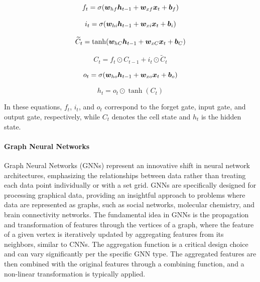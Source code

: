 \begin{equation}
f_t = \sigma(\bm {w}_{hf}\bm {h}_{t-1} + \bm {w}_{xf}\bm {x}_t + \bm {b}_f)
\end{equation}

\begin{equation}
i_t = \sigma(\bm {w}_{hi}\bm {h}_{t-1} + \bm {w}_{xi}\bm {x}_t + \bm {b}_i)
\end{equation}

\begin{equation}
\widetilde{C}_t = \tanh(\bm {w}_{hC}\bm {h}_{t-1} + \bm {w}_{xC}\bm {x}_t + \bm {b}_C)
\end{equation}

\begin{equation}
C_t = f_t \odot C_{t-1} + i_t \odot \widetilde{C}_t
\end{equation}

\begin{equation}
o_t = \sigma(\bm {w}_{ho}\bm {h}_{t-1} + \bm {w}_{xo}\bm {x}_t + \bm {b}_o)
\end{equation}

\begin{equation}
h_t = o_t \odot \tanh(C_t)
\end{equation}

In these equations, $f_t$, $i_t$, and $o_t$ correspond to the forget gate, input gate, and output gate, respectively, while $C_t$ denotes the cell state and $h_t$ is the hidden state.

\paragraph{Graph Neural Networks}

Graph Neural Networks (GNNs) represent an innovative shift in neural network architectures, emphasizing the relationships between data rather than treating each data point individually or with a set grid. GNNs are specifically designed for processing graphical data, providing an insightful approach to problems where data are represented as graphs, such as social networks, molecular chemistry, and brain connectivity networks. The fundamental idea in GNNs is the propagation and transformation of features through the vertices of a graph, where the feature of a given vertex is iteratively updated by aggregating features from its neighbors, similar to CNNs. The aggregation function is a critical design choice and can vary significantly per the specific GNN type. The aggregated features are then combined with the original features through a combining function, and a non-linear transformation is typically applied. 

